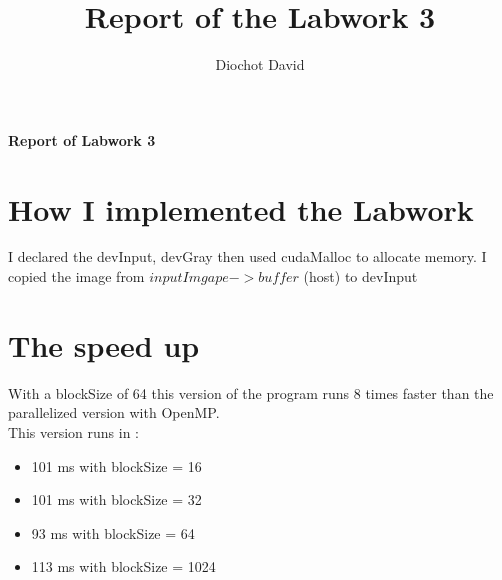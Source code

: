 \documentclass[a4paper]{article}
\title{Report of the Labwork 3}
\author{Diochot David}
\begin{document}
\begin{center}
    { \huge \bfseries Report of Labwork 3 \\[0.4cm] }
\end{center}


\section{How I implemented the Labwork}

I declared the devInput, devGray then used cudaMalloc to allocate memory.
I copied the image from $  inputImgape->buffer $ (host) to devInput 


\section{The speed up}

With a blockSize of 64 this version of the program runs 8 times faster than the parallelized 
version with OpenMP. \\

This version runs in : \\
\begin{itemize}
    \item 101 ms with blockSize = 16
    \item 101 ms with blockSize = 32
    \item 93 ms with blockSize = 64
    \item 113 ms with blockSize = 1024
\end{itemize}
    
\end{document}
